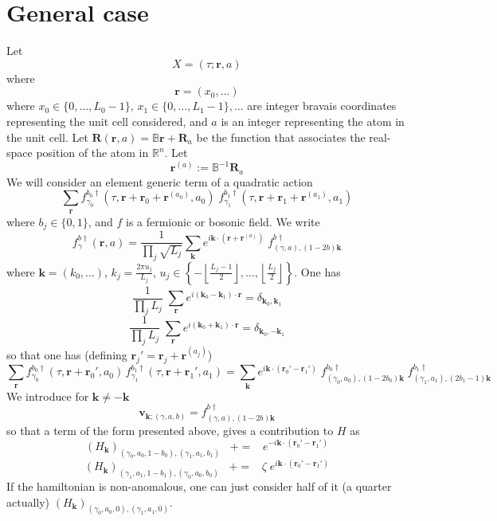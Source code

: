 \documentclass{article}
\begin{document}
\section{General case}
Let
$$
X = (\tau;\mathbf{r},a)
$$
where
$$
\mathbf{r} = \left(x_0,\dots\right)
$$
where $x_0\in\{0,\dots,L_0-1\},\, x_1\in\{0,\dots,L_1-1\}, \dots$ are integer bravais coordinates representing the unit cell considered, and $a$ is an integer representing the atom in the unit cell. Let $\mathbf{R}(\mathbf{r},a)=\mathbb{B}\mathbf{r}+\mathbf{R}_a$ be the function that associates the real-space position of the atom in $\mathbb{R}^n$. Let
$$
\mathbf{r}^{(a)} := \mathbb{B}^{-1}\mathbf{R}_a
$$
We will consider an element generic term of a quadratic action
$$
\sum_{\mathbf{r}}f_{\gamma_0}^{b_0\dagger}(\tau,\mathbf{r}+\mathbf{r}_0+\mathbf{r}^{(a_0)},a_0)\;f_{\gamma_1}^{b_1\dagger}(\tau,\mathbf{r}+\mathbf{r}_1+\mathbf{r}^{(a_1)},a_1)
$$
where $b_j\in\{0,1\}$, and $f$ is a fermionic or bosonic field. We write
$$
f_\gamma^{b\dagger}(\mathbf{r}, a)=\frac{1}{\prod_j\sqrt{L_j}}\sum_{\mathbf{k}} e^{i\mathbf{k}\cdot(\mathbf{r}+\mathbf{r}^{(a)})}\;f_{(\gamma,a), (1-2b)\mathbf{k}}^{b\dagger}
$$
where $\mathbf{k} = (k_0,\dots)$, $k_j = \frac{2\pi u_j}{L_j}$, $u_j\in \left\{-\left\lfloor \frac{L_j-1}{2}\right\rfloor,\dots,\left\lfloor\frac{L_j}{2}\right\rfloor\right\}$. One has
$$
\frac{1}{\prod_j L_j}\;\sum_{\mathbf{r}}e^{i(\mathbf{k}_0-\mathbf{k}_1)\cdot\mathbf{r}}=\delta_{\mathbf{k}_0,\mathbf{k}_1}
$$
$$
\frac{1}{\prod_j L_j}\;\sum_{\mathbf{r}}e^{i(\mathbf{k}_0+\mathbf{k}_1)\cdot\mathbf{r}}=\delta_{\mathbf{k}_0,-\mathbf{k}_1}
$$
so that one has (defining $\mathbf{r}_j'=\mathbf{r}_j+\mathbf{r}^{(a_j)}$)
$$
\sum_{\mathbf{r}}f_{\gamma_0}^{b_0\dagger}(\tau,\mathbf{r}+\mathbf{r}_0',a_0)\,f_{\gamma_1}^{b_1\dagger}(\tau,\mathbf{r}+\mathbf{r}_1',a_1)=\sum_{\mathbf{k}}e^{i\mathbf{k}\cdot(\mathbf{r}_0'-\mathbf{r}_1')}\;f_{(\gamma_0,a_0),(1-2b_0)\mathbf{k}}^{b_0\dagger}\;f_{(\gamma_1,a_1),(2b_1-1)\mathbf{k}}^{b_1\dagger}
$$
We introduce for $\mathbf{k}\neq -\mathbf{k}$
$$
\mathbf{v}_{\mathbf{k};(\gamma,a,b)}=f_{(\gamma,a),(1-2b)\mathbf{k}}^{b\dagger}
$$
so that a term of the form presented above, gives a contribution to $H$ as
$$
\left(H_{\mathbf{k}}\right)_{(\gamma_0,a_0,1-b_0),(\gamma_1,a_1,b_1)}\;\;\; += \;\;\;e^{-i\mathbf{k}\cdot(\mathbf{r}_0'-\mathbf{r}_1')}
$$
$$
\left(H_{\mathbf{k}}\right)_{(\gamma_1,a_1,1-b_1), (\gamma_0,a_0,b_0)}\;\;\; += \;\;\;\zeta\;e^{i\mathbf{k}\cdot(\mathbf{r}_0'-\mathbf{r}_1')}
$$
If the hamiltonian is non-anomalous, one can just consider half of it (a quarter actually) $\left(H_{\mathbf{k}}\right)_{(\gamma_0, a_0,0),(\gamma_1, a_1,0)}$.
\end{document}
